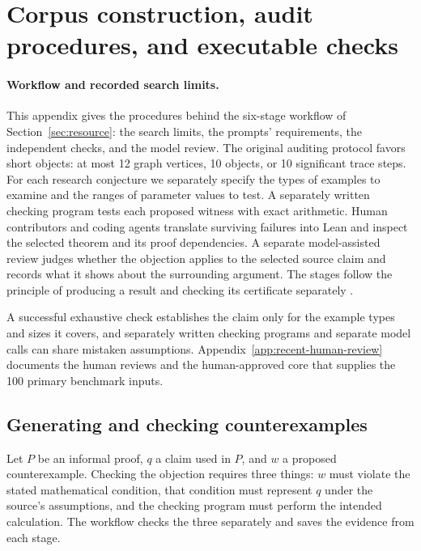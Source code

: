 \section{Corpus construction, audit procedures, and executable checks}
\label{sec:method}

\paragraph{Workflow and recorded search limits.}
This appendix gives the procedures behind the six-stage workflow of Section~\ref{sec:resource}: the search limits, the prompts' requirements, the independent checks, and the model review. The original auditing protocol favors short objects: at most 12 graph vertices, 10 objects, or 10 significant trace steps. For each research conjecture we separately specify the types of examples to examine and the ranges of parameter values to test. A separately written checking program tests each proposed witness with exact arithmetic. Human contributors and coding agents translate surviving failures into Lean and inspect the selected theorem and its proof dependencies. A separate model-assisted review judges whether the objection applies to the selected source claim and records what it shows about the surrounding argument. The stages follow the principle of producing a result and checking its certificate separately \citep{mcconnell2011certifying,moura2021lean,mathlib2020}.

A successful exhaustive check establishes the claim only for the example types and sizes it covers, and separately written checking programs and separate model calls can share mistaken assumptions. Appendix~\ref{app:recent-human-review} documents the human reviews and the human-approved core that supplies the 100 primary benchmark inputs.

\subsection{Generating and checking counterexamples}
\label{sec:method-generation}

Let $P$ be an informal proof, $q$ a claim used in $P$, and $w$ a proposed counterexample. Checking the objection requires three things: $w$ must violate the stated mathematical condition, that condition must represent $q$ under the source's assumptions, and the checking program must perform the intended calculation. The workflow checks the three separately and saves the evidence from each stage.

